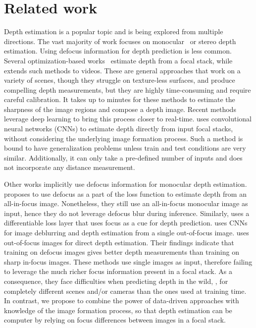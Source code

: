 \documentclass[10pt,twocolumn,letterpaper]{article}
\begin{document}
\section{Related work}

Depth estimation is a popular topic and is being explored from multiple directions. The vast majority of work focuses on monocular~\cite{Guo18, DBLP:conf/cvpr/FuGWBT18,Yin_2019_ICCV} or stereo \cite{DBLP:conf/cvpr/ZhangPYT19, DBLP:conf/cvpr/SmolyanskiyKB18} depth estimation. Using defocus information for depth prediction is less common.
Several optimization-based works~\cite{Suwajanakorn15,Surh17} estimate depth from a focal stack, while \cite{VideoDFD_Kim16} extends such methods to videos. These are general approaches that work on a variety of scenes, though they struggle on texture-less surfaces, and produce compelling depth measurements, but they are highly time-consuming and require careful calibration. It takes up to minutes for these methods to estimate the sharpness of the image regions and compose a depth image.
Recent methods leverage deep learning to bring this process closer to real-time. \cite{Hazirbas18} uses convolutional neural networks (CNNs) to estimate depth directly from input focal stacks, without considering the underlying image formation process. Such a method is bound to have generalization problems unless train and test conditions are very similar.  Additionally, it can only take a pre-defined number of inputs and does not incorporate any distance measurement.


Other works \cite{DepthEA_Anwar2017, Srinivasan18, Carvalho2018icip} implicitly use defocus information for monocular depth estimation. \cite{Srinivasan18} proposes to use defocus as a part of the loss function to estimate depth from an all-in-focus image. Nonetheless, they still use an all-in-focus monocular image as input, hence they do not leverage defocus blur during inference. 
Similarly, \cite{DBLP:conf/cvpr/GurW19} uses a differentiable loss layer that uses focus as a cue for depth prediction.
\cite{DepthEA_Anwar2017} uses CNNs for image deblurring and depth estimation from a single out-of-focus image. \cite{Carvalho2018icip} uses out-of-focus images for direct depth estimation. Their findings indicate that training on defocus images gives better depth measurements than training on sharp in-focus images. These methods use single images as input, therefore failing to leverage the much richer focus information present in a focal stack. As a consequence, they face difficulties when predicting depth in the wild, \ie, for completely different scenes and/or cameras than the ones used at training time.
In contrast, we propose to combine the power of data-driven approaches with knowledge of the image formation process, so that depth estimation can be computer by relying on focus differences between images in a focal stack.
\end{document}
